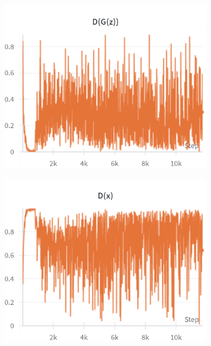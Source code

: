 \begin{figure}[H]
    \begin{subfigure}{0.45\textwidth}
        \centering
        \includegraphics[width=0.95\linewidth]{cifar10/64_nz100/D_G_z.png}
        \caption{}
        \label{subfig:cifar10/64_nz100/D_G_z}
    \end{subfigure}%
    \begin{subfigure}{0.45\textwidth}
        \centering
        \includegraphics[width=0.95\linewidth]{cifar10/64_nz100/D_x.png}
        \caption{}
        \label{subfig:cifar10/64_nz100/D_x}
    \end{subfigure}


\end{figure}
